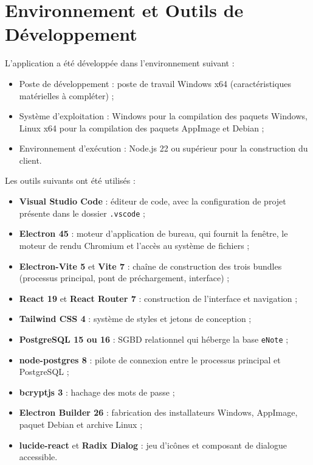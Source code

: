 \section{Environnement et Outils de Développement}
L'application a été développée dans l'environnement suivant :
\begin{itemize}
    \item Poste de développement : %
          poste de travail Windows x64 (caractéristiques matérielles à compléter) ;
    \item Système d'exploitation : Windows pour la compilation des paquets Windows, Linux x64 pour la
          compilation des paquets AppImage et Debian ;
    \item Environnement d'exécution : Node.js 22 ou supérieur pour la construction du client.
\end{itemize}
Les outils suivants ont été utilisés :
\begin{itemize}
    \item \textbf{Visual Studio Code} : éditeur de code, avec la configuration de projet présente dans
          le dossier \texttt{.vscode} ;
    \item \textbf{Electron 45} : moteur d'application de bureau, qui fournit la fenêtre, le moteur de
          rendu Chromium et l'accès au système de fichiers ;
    \item \textbf{Electron-Vite 5} et \textbf{Vite 7} : chaîne de construction des trois bundles
          (processus principal, pont de préchargement, interface) ;
    \item \textbf{React 19} et \textbf{React Router 7} : construction de l'interface et navigation ;
    \item \textbf{Tailwind CSS 4} : système de styles et jetons de conception ;
    \item \textbf{PostgreSQL 15 ou 16} : \ac{SGBD} relationnel qui héberge la base \texttt{eNote} ;
    \item \textbf{node-postgres 8} : pilote de connexion entre le processus principal et PostgreSQL ;
    \item \textbf{bcryptjs 3} : hachage des mots de passe ;
    \item \textbf{Electron Builder 26} : fabrication des installateurs Windows, AppImage, paquet Debian
          et archive Linux ;
    \item \textbf{lucide-react} et \textbf{Radix Dialog} : jeu d'icônes et composant de dialogue
          accessible.
\end{itemize}

